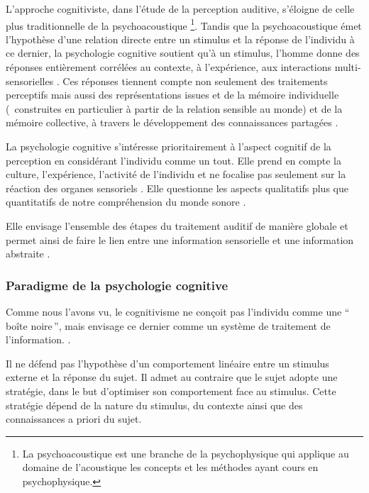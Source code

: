 L'approche cognitiviste, dans l'étude de la perception auditive, s'éloigne de celle plus traditionnelle de la psychoacoustique \footnote{La psychoacoustique est une branche de la psychophysique qui applique au domaine de l'acoustique les concepts et les méthodes ayant cours en psychophysique.}. Tandis que la psychoacoustique émet l'hypothèse d'une relation directe entre un stimulus et la réponse de l'individu à ce dernier, la psychologie cognitive soutient qu'à un stimulus, l'homme donne des réponses entièrement corrélées au contexte, à l'expérience, aux interactions multi-sensorielles \citep{maffiolo_marieParis_1997}. Ces réponses tiennent compte non seulement des traitements perceptifs mais aussi des représentations issues et de la mémoire individuelle (\ie~construites en particulier à partir de la relation sensible au monde) et de la mémoire collective, à travers le développement des connaissances partagées \citep[p. ??]{maffiolo_caracterisation_1999}.

La psychologie cognitive s'intéresse prioritairement à l'aspect cognitif de la perception en considérant l'individu comme un tout. Elle prend en compte la culture, l'expérience, l'activité de l'individu et ne focalise pas seulement sur la réaction des organes sensoriels . Elle questionne les aspects qualitatifs plus que quantitatifs de notre compréhension du monde sonore \citep[p. ??]{maffiolo_caracterisation_1999}.

Elle envisage l'ensemble des étapes du traitement auditif de manière globale et permet ainsi de faire le lien entre une information sensorielle et une information abstraite \citep{mcadams1994penser}.

\subsubsection{Paradigme de la psychologie cognitive}

Comme nous l'avons vu, le cognitivisme ne conçoit pas l'individu comme une ``\,boîte noire\,'', mais envisage ce dernier comme un système de traitement de l'information. .

Il ne défend pas l'hypothèse d'un comportement linéaire entre un stimulus externe et la réponse du sujet. Il admet au contraire que le sujet adopte une stratégie, dans le but d'optimiser son comportement face au stimulus. Cette stratégie dépend de la nature du stimulus, du contexte ainsi que des connaissances a priori du sujet.

